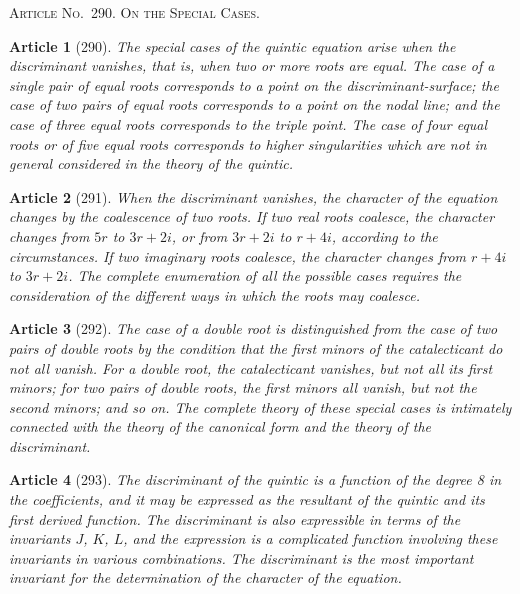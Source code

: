 \documentclass[11pt,a4paper]{article}
\theoremstyle{cayley}
\newtheorem{art}{Article}
\begin{document}
\begin{center}
\textsc{Article No.\ 290. On the Special Cases.}
\end{center}

\begin{art}[290]
The special cases of the quintic equation arise when the discriminant vanishes, that is, when two or more roots are equal. The case of a single pair of equal roots corresponds to a point on the discriminant-surface; the case of two pairs of equal roots corresponds to a point on the nodal line; and the case of three equal roots corresponds to the triple point. The case of four equal roots or of five equal roots corresponds to higher singularities which are not in general considered in the theory of the quintic.
\end{art}

\begin{art}[291]
When the discriminant vanishes, the character of the equation changes by the coalescence of two roots. If two real roots coalesce, the character changes from $5r$ to $3r+2i$, or from $3r+2i$ to $r+4i$, according to the circumstances. If two imaginary roots coalesce, the character changes from $r+4i$ to $3r+2i$. The complete enumeration of all the possible cases requires the consideration of the different ways in which the roots may coalesce.
\end{art}

\begin{art}[292]
The case of a double root is distinguished from the case of two pairs of double roots by the condition that the first minors of the catalecticant do not all vanish. For a double root, the catalecticant vanishes, but not all its first minors; for two pairs of double roots, the first minors all vanish, but not the second minors; and so on. The complete theory of these special cases is intimately connected with the theory of the canonical form and the theory of the discriminant.
\end{art}

\begin{art}[293]
The discriminant of the quintic is a function of the degree 8 in the coefficients, and it may be expressed as the resultant of the quintic and its first derived function. The discriminant is also expressible in terms of the invariants $J$, $K$, $L$, and the expression is a complicated function involving these invariants in various combinations. The discriminant is the most important invariant for the determination of the character of the equation.
\end{art}
\end{document}
